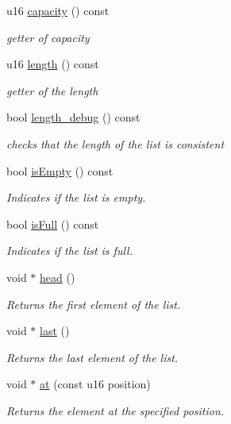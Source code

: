 \begin{DoxyCompactItemize}
u16 \hyperlink{class_d_l_list_a7913658d122e6883ed7ddf3145567d67}{capacity} () const
\begin{DoxyCompactList}\small\item\em getter of capacity \end{DoxyCompactList}\item 
u16 \hyperlink{class_d_l_list_a13e8782dda500ed2ef042793139cd244}{length} () const
\begin{DoxyCompactList}\small\item\em getter of the length \end{DoxyCompactList}\item 
bool \hyperlink{class_d_l_list_abd76bf71a8021ef4be9f76a32cc679a8}{length\+\_\+debug} () const
\begin{DoxyCompactList}\small\item\em checks that the length of the list is consistent \end{DoxyCompactList}\item 
bool \hyperlink{class_d_l_list_a45b7bf2d077487db54b048c61229de0b}{is\+Empty} () const
\begin{DoxyCompactList}\small\item\em Indicates if the list is empty. \end{DoxyCompactList}\item 
bool \hyperlink{class_d_l_list_ac070f23fc7a9617809e19c007884f1f0}{is\+Full} () const
\begin{DoxyCompactList}\small\item\em Indicates if the list is full. \end{DoxyCompactList}\item 
void $\ast$ \hyperlink{class_d_l_list_ab59e7efc3cd0aef304a93d214fb7343a}{head} ()
\begin{DoxyCompactList}\small\item\em Returns the first element of the list. \end{DoxyCompactList}\item 
void $\ast$ \hyperlink{class_d_l_list_a76dad466eebcb03e5897573a018ff54d}{last} ()
\begin{DoxyCompactList}\small\item\em Returns the last element of the list. \end{DoxyCompactList}\item 
void $\ast$ \hyperlink{class_d_l_list_ad32250353857bb6a02e1d9148da5eeca}{at} (const u16 position)
\begin{DoxyCompactList}\small\item\em Returns the element at the specified position. \end{DoxyCompactList}\item 

\end{DoxyCompactItemize}
